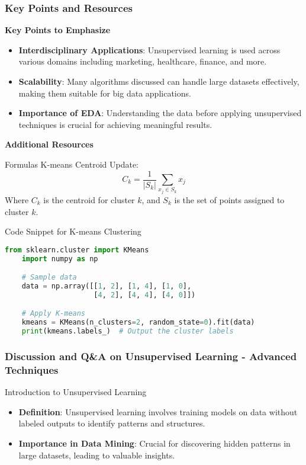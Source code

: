 \documentclass[aspectratio=169]{beamer}
\begin{document}
\begin{frame}[fragile]
    \frametitle{Key Points and Resources}
    \textbf{Key Points to Emphasize}
    \begin{itemize}
        \item \textbf{Interdisciplinary Applications}: Unsupervised learning is used across various domains including marketing, healthcare, finance, and more.
        \item \textbf{Scalability}: Many algorithms discussed can handle large datasets effectively, making them suitable for big data applications.
        \item \textbf{Importance of EDA}: Understanding the data before applying unsupervised techniques is crucial for achieving meaningful results.
    \end{itemize}

    \textbf{Additional Resources}
    \begin{block}{Formulas}
        K-means Centroid Update:
        \begin{equation}
            C_k = \frac{1}{|S_k|} \sum_{x_j \in S_k} x_j
        \end{equation}
        Where \(C_k\) is the centroid for cluster \(k\), and \(S_k\) is the set of points assigned to cluster \(k\).
    \end{block}

    \begin{block}{Code Snippet for K-means Clustering}
    \begin{lstlisting}[language=Python]
    from sklearn.cluster import KMeans
    import numpy as np

    # Sample data
    data = np.array([[1, 2], [1, 4], [1, 0], 
                     [4, 2], [4, 4], [4, 0]])

    # Apply K-means
    kmeans = KMeans(n_clusters=2, random_state=0).fit(data)
    print(kmeans.labels_)  # Output the cluster labels
    \end{lstlisting}
    \end{block}
\end{frame}

\begin{frame}[fragile]
    \frametitle{Discussion and Q\&A on Unsupervised Learning - Advanced Techniques}
    \begin{block}{Introduction to Unsupervised Learning}
        \begin{itemize}
            \item \textbf{Definition}: Unsupervised learning involves training models on data without labeled outputs to identify patterns and structures.
            \item \textbf{Importance in Data Mining}: Crucial for discovering hidden patterns in large datasets, leading to valuable insights.
        \end{itemize}
    \end{block}
\end{frame}
\end{document}
